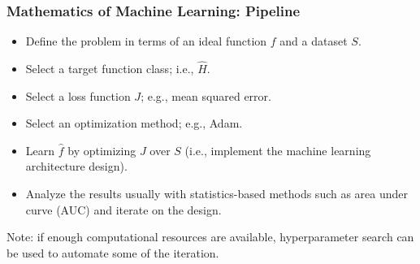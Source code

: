 		\begin{frame}
		\frametitle{Mathematics of Machine Learning: Pipeline}
		\begin{itemize}
			\item Define the problem in terms of an ideal function $f$ and a dataset $S$.
			\medskip
			\item Select a target function class; i.e., $\hat{H}$.
			\medskip
			\item Select a loss function $J$; e.g., mean squared error.
			\medskip
			\item Select an optimization method; e.g., Adam.
			\medskip
			\item Learn $\hat{f}$ by optimizing $J$ over $S$ (i.e., implement the machine learning architecture design).
			\medskip
			\item Analyze the results usually with statistics-based methods such as area under curve (AUC) and iterate on the design.
		\end{itemize}
		
		Note: if enough computational resources are available, hyperparameter search can be used to automate some of the iteration.
		
		\end{frame}
